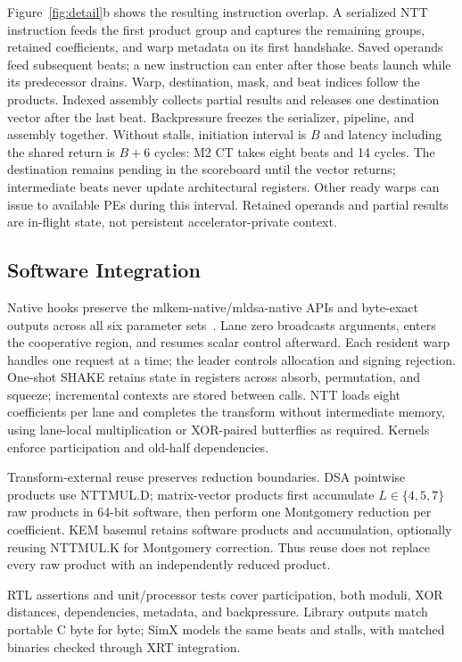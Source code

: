 \documentclass[conference,letterpaper]{IEEEtran}
\begin{document}
Figure~\ref{fig:detail}b shows the resulting instruction overlap. A serialized
NTT instruction feeds the first product group and captures the
remaining groups, retained coefficients, and warp metadata on its first
handshake. Saved operands feed subsequent beats; a new instruction can enter
after those beats launch while its predecessor drains. Warp, destination,
mask, and beat indices follow the products. Indexed assembly collects partial
results and releases one destination vector after the last beat. Backpressure
freezes the serializer, pipeline, and assembly together. Without stalls,
initiation interval is $B$ and latency including the shared return is $B+6$
cycles: M2 CT takes eight beats and 14 cycles. The destination remains pending
in the scoreboard until the vector returns; intermediate beats never update
architectural registers. Other ready warps can issue to available PEs during
this interval. Retained operands and partial results are in-flight state, not
persistent accelerator-private context.

\subsection{Software Integration}
Native hooks preserve the mlkem-native/mldsa-native APIs and byte-exact outputs
across all six parameter sets~\cite{mlkemnative,mldsanative}. Lane zero
broadcasts arguments, enters the cooperative region, and resumes scalar
control afterward. Each resident warp handles one request at a time; the
leader controls allocation and signing rejection. One-shot SHAKE retains state
in registers across absorb, permutation, and squeeze; incremental contexts are
stored between calls. NTT loads eight coefficients per lane and completes the
transform without intermediate memory, using lane-local multiplication or
XOR-paired butterflies as required. Kernels enforce participation and old-half
dependencies.

Transform-external reuse preserves reduction boundaries. DSA pointwise
products use NTTMUL.D; matrix-vector products first accumulate
$L\in\{4,5,7\}$ raw products in 64-bit software, then perform one Montgomery
reduction per coefficient. KEM basemul retains software products and
accumulation, optionally reusing NTTMUL.K for Montgomery correction. Thus reuse
does not replace every raw product with an independently reduced product.

RTL assertions and unit/processor tests cover participation, both moduli, XOR
distances, dependencies, metadata, and backpressure. Library outputs match
portable C byte for byte; SimX models the same beats and stalls, with matched
binaries checked through XRT integration.
\end{document}

